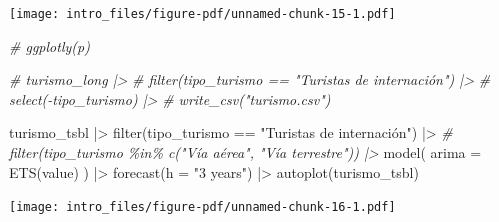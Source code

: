 \documentclass[
  letterpaper,
  DIV=11,
  numbers=noendperiod]{scrartcl}
\newenvironment{Shaded}{}{}
\newcommand{\AttributeTok}[1]{\textcolor[rgb]{0.65,0.15,0.64}{#1}}
\newcommand{\CommentTok}[1]{\textcolor[rgb]{0.63,0.63,0.65}{\textit{#1}}}
\newcommand{\FunctionTok}[1]{\textcolor[rgb]{0.25,0.47,0.95}{#1}}
\newcommand{\NormalTok}[1]{\textcolor[rgb]{0.22,0.23,0.26}{#1}}
\newcommand{\SpecialCharTok}[1]{\textcolor[rgb]{0.00,0.52,0.74}{#1}}
\newcommand{\StringTok}[1]{\textcolor[rgb]{0.31,0.63,0.31}{#1}}
\begin{document}
\texttt{[image: intro\_files/figure-pdf/unnamed-chunk-15-1.pdf]}

\begin{Shaded}
\begin{Highlighting}[]
\CommentTok{\# ggplotly(p)}
\end{Highlighting}
\end{Shaded}

\begin{Shaded}
\begin{Highlighting}[]
\CommentTok{\# turismo\_long |\textgreater{} }
\CommentTok{\#   filter(tipo\_turismo == "Turistas de internación") |\textgreater{} }
\CommentTok{\#   select({-}tipo\_turismo) |\textgreater{} }
\CommentTok{\#   write\_csv("turismo.csv")}

\NormalTok{turismo\_tsbl }\SpecialCharTok{|\textgreater{}} 
  \FunctionTok{filter}\NormalTok{(tipo\_turismo }\SpecialCharTok{==} \StringTok{"Turistas de internación"}\NormalTok{) }\SpecialCharTok{|\textgreater{}} 
  \CommentTok{\# filter(tipo\_turismo \%in\% c("Vía aérea", "Vía terrestre")) |\textgreater{} }
  \FunctionTok{model}\NormalTok{(}
    \AttributeTok{arima =} \FunctionTok{ETS}\NormalTok{(value)}
\NormalTok{  ) }\SpecialCharTok{|\textgreater{}} 
  \FunctionTok{forecast}\NormalTok{(}\AttributeTok{h =} \StringTok{"3 years"}\NormalTok{) }\SpecialCharTok{|\textgreater{}} 
  \FunctionTok{autoplot}\NormalTok{(turismo\_tsbl)}
\end{Highlighting}
\end{Shaded}

\texttt{[image: intro\_files/figure-pdf/unnamed-chunk-16-1.pdf]}
\end{document}
